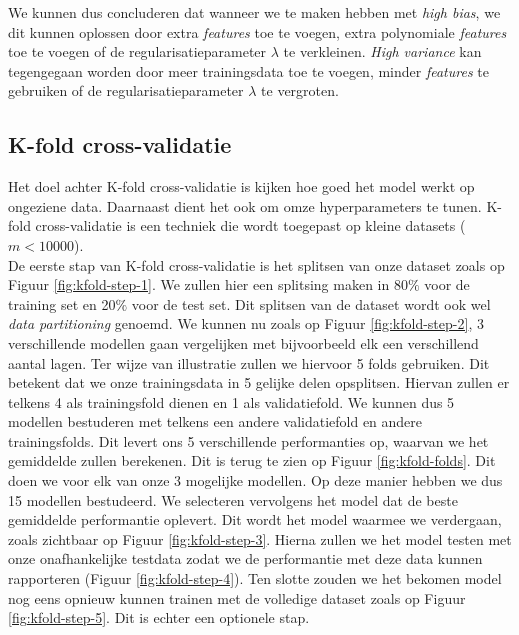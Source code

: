 We kunnen dus concluderen dat wanneer we te maken hebben met \textit{high bias}, we dit kunnen oplossen door extra \textit{features} toe te voegen, extra polynomiale \textit{features} toe te voegen of de regularisatieparameter $\lambda$ te verkleinen. \textit{High variance} kan tegengegaan worden door meer trainingsdata toe te voegen, minder \textit{features} te gebruiken of de regularisatieparameter $\lambda$ te vergroten. 

\subsection{K-fold cross-validatie}

Het doel achter K-fold cross-validatie is kijken hoe goed het model werkt op ongeziene data. Daarnaast dient het ook om omze hyperparameters te tunen. K-fold cross-validatie is een techniek die wordt toegepast op kleine datasets ($m < 10 000$). \\
\newline
De eerste stap van K-fold cross-validatie is het splitsen van onze dataset zoals op Figuur \ref{fig:kfold-step-1}. We zullen hier een splitsing maken in 80$\%$ voor de training set en 20$\%$ voor de test set. Dit splitsen van de dataset wordt ook wel \textit{data partitioning} genoemd. We kunnen nu zoals op Figuur \ref{fig:kfold-step-2}, 3 verschillende modellen gaan vergelijken met bijvoorbeeld elk een verschillend aantal lagen. Ter wijze van illustratie zullen we hiervoor 5 folds gebruiken. Dit betekent dat we onze trainingsdata in 5 gelijke delen opsplitsen. Hiervan zullen er telkens 4 als trainingsfold dienen en 1 als validatiefold. We kunnen dus 5 modellen bestuderen met telkens een andere validatiefold en andere trainingsfolds. Dit levert ons 5 verschillende performanties op, waarvan we het gemiddelde zullen berekenen. Dit is terug te zien op Figuur \ref{fig:kfold-folds}. Dit doen we voor elk van onze 3 mogelijke modellen. Op deze manier hebben we dus 15 modellen bestudeerd. We selecteren vervolgens het model dat de beste gemiddelde performantie oplevert. Dit wordt het model waarmee we verdergaan, zoals zichtbaar op Figuur \ref{fig:kfold-step-3}. Hierna zullen we het model testen met onze onafhankelijke testdata zodat we de performantie met deze data kunnen rapporteren (Figuur \ref{fig:kfold-step-4}). Ten slotte zouden we het bekomen model nog eens opnieuw kunnen trainen met de volledige dataset zoals op Figuur \ref{fig:kfold-step-5}. Dit is echter een optionele stap.
\newpage
